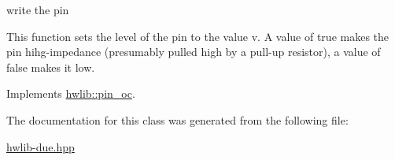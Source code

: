 write the pin 

This function sets the level of the pin to the value v. A value of true makes the pin hihg-\/impedance (presumably pulled high by a pull-\/up resistor), a value of false makes it low. 

Implements \hyperlink{classhwlib_1_1pin__oc_a2165622dad253a423d2fa52cbed7c553}{hwlib\+::pin\+\_\+oc}.



The documentation for this class was generated from the following file\+:\begin{DoxyCompactItemize}
\item 
\hyperlink{hwlib-due_8hpp}{hwlib-\/due.\+hpp}\end{DoxyCompactItemize}
